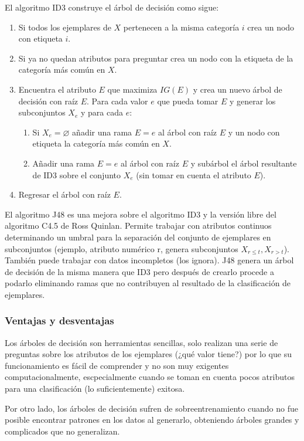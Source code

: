 \documentclass[spanish,11pt,letterpaper]{article}
\begin{document}
El algoritmo ID3 construye el árbol de decisión como sigue:
\begin{enumerate}
  \item Si todos los ejemplares de $X$ pertenecen a la misma categoría $i$ crea un nodo con etiqueta $i$.
  \item Si ya no quedan atributos para preguntar crea un nodo con la etiqueta de la categoría más común en $X$.
  \item Encuentra el atributo $E$ que maximiza $IG(E)$ y crea un nuevo árbol de decisión con raíz $E$. Para cada valor $e$ que pueda tomar $E$ y generar los subconjuntos $X_e$ y para cada $e$:
  \begin{enumerate}
    \item Si $X_e = \varnothing$ añadir una rama $E=e$ al árbol con raíz $E$ y un nodo con etiqueta la categoría más común en $X$.
    \item Añadir una rama $E=e$ al árbol con raíz $E$ y subárbol el árbol resultante de ID3 sobre el conjunto $X_e$ (sin tomar en cuenta el atributo $E$).
  \end{enumerate}
  \item Regresar el árbol con raíz $E$.
\end{enumerate}

El algoritmo J48 es una mejora sobre el algoritmo ID3 y la versión libre del
algoritmo C4.5 de Ross Quinlan. Permite trabajar con atributos continuos determinando
un umbral para la separación del conjunto de ejemplares en subconjuntos (ejemplo,
atributo numérico r, genera subconjuntos $X_{r\leq t},X_{r > t}$). También puede
trabajar con datos incompletos (los ignora). J48 genera un árbol de decisión de
la misma manera que ID3 pero después de crearlo procede a podarlo eliminando ramas
que no contribuyen al resultado de la clasificación de ejemplares.

\subsubsection{Ventajas y desventajas}

Los árboles de decisión son herramientas sencillas, solo realizan una serie de
preguntas sobre los atributos de los ejemplares (¿qué valor tiene?) por lo que
su funcionamiento es fácil de comprender y no son muy exigentes computacionalmente,
escpecialmente cuando se toman en cuenta pocos atributos para una clasificación
(lo suficientemente) exitosa.

Por otro lado, los árboles de decisión sufren de sobreentrenamiento cuando no
fue posible encontrar patrones en los datos al generarlo, obteniendo árboles
grandes y complicados que no generalizan.
\end{document}
